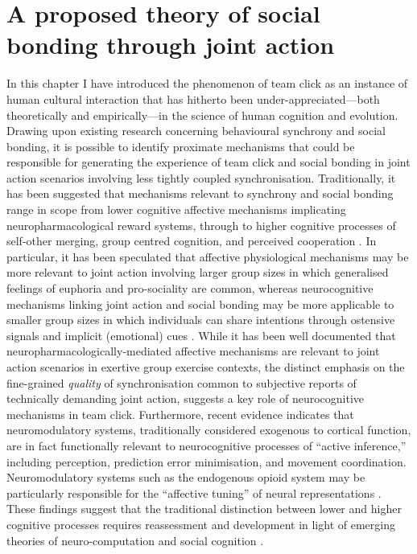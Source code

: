 \clearpage
\section{A proposed theory of social bonding through joint action}
In this chapter I have introduced the phenomenon of team click as an instance of human cultural interaction that has hitherto been under-appreciated---both theoretically and empirically---in the science of human cognition and evolution.  Drawing upon existing research concerning behavioural synchrony and social bonding, it is possible to identify proximate mechanisms that could be responsible for generating the experience of team click and social bonding in joint action scenarios involving less tightly coupled synchronisation.
Traditionally, it has been suggested that mechanisms relevant to synchrony and social bonding range in scope from lower cognitive affective mechanisms implicating neuropharmacological reward systems, through to higher cognitive processes of self-other merging, group centred cognition, and perceived cooperation \citep{Mogan2017}. In particular, it has been speculated that affective physiological mechanisms may be more relevant to joint action involving larger group sizes in which generalised feelings of euphoria and pro-sociality are common, whereas neurocognitive mechanisms linking joint action and social bonding may be more applicable to smaller group sizes in which individuals can share intentions through ostensive signals and implicit (emotional) cues \citep{Semin2008,Frith2010}.
While it has been well documented that neuropharmacologically-mediated affective mechanisms are relevant to joint action scenarios in exertive group exercise contexts\citep{Cohen2009,Sullivan2013,Tarr2015}, the distinct emphasis on the fine-grained \textit{quality} of synchronisation common to subjective reports of technically demanding joint action, suggests a key role of neurocognitive mechanisms in team click.
Furthermore, recent evidence indicates that neuromodulatory systems, traditionally considered exogenous to cortical function, are in fact functionally relevant to neurocognitive processes of ``active inference,'' including perception, prediction error minimisation, and movement coordination\citep{Pessoa2013,Krahe2013,Buchel2014,Miller2017}.  Neuromodulatory systems such as the endogenous opioid system may be particularly responsible for the ``affective tuning'' of neural representations \citep{Panksepp1998,Pessoa2013}. These findings suggest that the traditional distinction between lower and higher cognitive processes requires reassessment and development in light of emerging theories of neuro-computation and social cognition \citep{Pessoa2013,Clark2013}.

